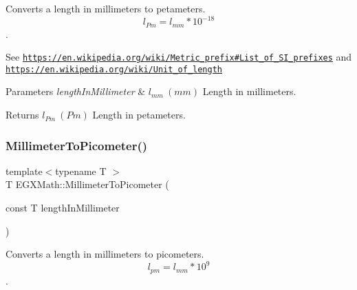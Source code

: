 Converts a length in millimeters to petameters. \[ l_{Pm}=l_{mm} * 10^{-18} \]. 

See \href{https://en.wikipedia.org/wiki/Metric_prefix#List_of_SI_prefixes}{\tt https\+://en.\+wikipedia.\+org/wiki/\+Metric\+\_\+prefix\#\+List\+\_\+of\+\_\+\+S\+I\+\_\+prefixes} and \href{https://en.wikipedia.org/wiki/Unit_of_length}{\tt https\+://en.\+wikipedia.\+org/wiki/\+Unit\+\_\+of\+\_\+length} 
\begin{DoxyParams}{Parameters}
{\em length\+In\+Millimeter} & $ l_{mm}\ (mm)$ Length in millimeters. \\
\hline
\end{DoxyParams}
\begin{DoxyReturn}{Returns}
$ l_{Pm}\ (Pm)$ Length in petameters. 
\end{DoxyReturn}
\mbox{\label{group___e_g_x_math-_conversions-_length_conversions-_s_i-_millimeter-_s_i_ga679e3714c229f1355a5c9bf707fcd723}} 
\subsubsection{\texorpdfstring{Millimeter\+To\+Picometer()}{MillimeterToPicometer()}}
{\footnotesize\ttfamily template$<$typename T $>$ \\
T E\+G\+X\+Math\+::\+Millimeter\+To\+Picometer (\begin{DoxyParamCaption}\item[{const T}]{length\+In\+Millimeter }\end{DoxyParamCaption})}



Converts a length in millimeters to picometers. \[ l_{pm}=l_{mm} * 10^{9} \]. 

